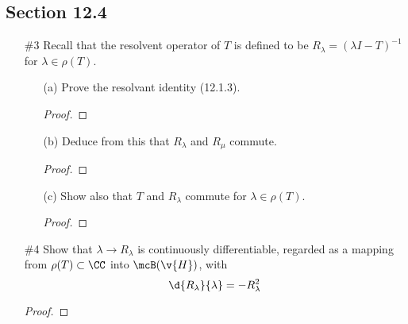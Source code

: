\documentclass[11pt, oneside]{article}
\begin{document}
\subsection*{Section 12.4}
\begin{enumerate}
  \item[\#3]
    Recall that the resolvent operator of $T$ is defined to be
    $R_{\lambda} = (\lambda I - T)^{-1}$ for $\lambda \in \rho(T)$.
    \begin{enumerate}
      \item[(a)]
        Prove the resolvant identity (12.1.3).

        \begin{proof}
          
        \end{proof}

      \item[(b)]
        Deduce from this that $R_{\lambda}$ and $R_{\mu}$ commute.

        \begin{proof}
          
        \end{proof}

      \item[(c)]
        Show also that $T$ and $R_{\lambda}$ commute for $\lambda \in \rho(T)$.

        \begin{proof}
          
        \end{proof}
    \end{enumerate}

  \pagebreak
  \item[\#4]
    Show that $\lambda \to R_{\lambda}$ is continuously differentiable, regarded
    as a mapping from $\rho(T) \subset \CC$ into $\mcB(\v{H})$, with
    \[
      \d{R_{\lambda}}{\lambda} = -R_{\lambda}^2
    \]

    \begin{proof}
      
    \end{proof}
\end{enumerate}
\end{document}
